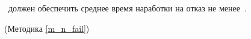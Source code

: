 \dut \ должен обеспечить среднее время наработки на отказ не менее~\tnfail.

\begin{flushright}
	(Методика \ref{m_n_fail})
\end{flushright}